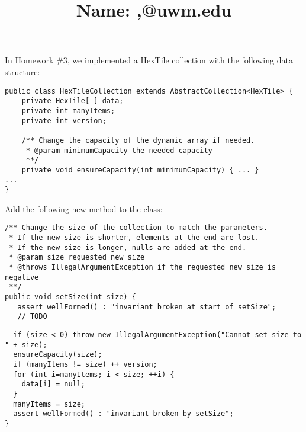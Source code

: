 \documentclass[12pt]{article}
\title[Quiz \#4]{Name: \hrulefill\hrulefill,\quad \hrulefill @uwm.edu}
\begin{document}
\maketitle

In Homework \#3, we implemented a HexTile collection with the following data structure:
\begin{verbatim}
public class HexTileCollection extends AbstractCollection<HexTile> {
    private HexTile[ ] data;
    private int manyItems;
    private int version;
    
    /** Change the capacity of the dynamic array if needed.
     * @param minimumCapacity the needed capacity
     **/
    private void ensureCapacity(int minimumCapacity) { ... }
...
}
\end{verbatim}
Add the following new method to the class:
\begin{verbatim}
/** Change the size of the collection to match the parameters.
 * If the new size is shorter, elements at the end are lost.
 * If the new size is longer, nulls are added at the end.
 * @param size requested new size
 * @throws IllegalArgumentException if the requested new size is negative
 **/
public void setSize(int size) {
   assert wellFormed() : "invariant broken at start of setSize";
   // TODO
\end{verbatim}
\begin{solution}
\begin{verbatim}
  if (size < 0) throw new IllegalArgumentException("Cannot set size to " + size);
  ensureCapacity(size);
  if (manyItems != size) ++ version;
  for (int i=manyItems; i < size; ++i) {
    data[i] = null;
  } 
  manyItems = size;
  assert wellFormed() : "invariant broken by setSize";
}
\end{verbatim}
\end{solution}

\newpage
\maketitle
\end{document}
